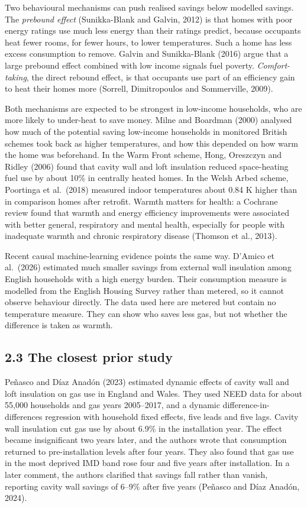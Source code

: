 \documentclass[11pt,a4paper]{article}
\begin{document}
Two behavioural mechanisms can push realised savings below modelled savings. The \emph{prebound effect} (Sunikka-Blank and Galvin, 2012) is that homes with poor energy ratings use much less energy than their ratings predict, because occupants heat fewer rooms, for fewer hours, to lower temperatures. Such a home has less excess consumption to remove. Galvin and Sunikka-Blank (2016) argue that a large prebound effect combined with low income signals fuel poverty. \emph{Comfort-taking}, the direct rebound effect, is that occupants use part of an efficiency gain to heat their homes more (Sorrell, Dimitropoulos and Sommerville, 2009).

Both mechanisms are expected to be strongest in low-income households, who are more likely to under-heat to save money. Milne and Boardman (2000) analysed how much of the potential saving low-income households in monitored British schemes took back as higher temperatures, and how this depended on how warm the home was beforehand. In the Warm Front scheme, Hong, Oreszczyn and Ridley (2006) found that cavity wall and loft insulation reduced space-heating fuel use by about 10\% in centrally heated homes. In the Welsh Arbed scheme, Poortinga et al.~(2018) measured indoor temperatures about 0.84 K higher than in comparison homes after retrofit. Warmth matters for health: a Cochrane review found that warmth and energy efficiency improvements were associated with better general, respiratory and mental health, especially for people with inadequate warmth and chronic respiratory disease (Thomson et al., 2013).

Recent causal machine-learning evidence points the same way. D'Amico et al.~(2026) estimated much smaller savings from external wall insulation among English households with a high energy burden. Their consumption measure is modelled from the English Housing Survey rather than metered, so it cannot observe behaviour directly. The data used here are metered but contain no temperature measure. They can show who saves less gas, but not whether the difference is taken as warmth.

\subsection*{2.3 The closest prior study}

Peñasco and Díaz Anadón (2023) estimated dynamic effects of cavity wall and loft insulation on gas use in England and Wales. They used NEED data for about 55,000 households and gas years 2005--2017, and a dynamic difference-in-differences regression with household fixed effects, five leads and five lags. Cavity wall insulation cut gas use by about 6.9\% in the installation year. The effect became insignificant two years later, and the authors wrote that consumption returned to pre-installation levels after four years. They also found that gas use in the most deprived IMD band rose four and five years after installation. In a later comment, the authors clarified that savings fall rather than vanish, reporting cavity wall savings of 6--9\% after five years (Peñasco and Díaz Anadón, 2024).
\end{document}
